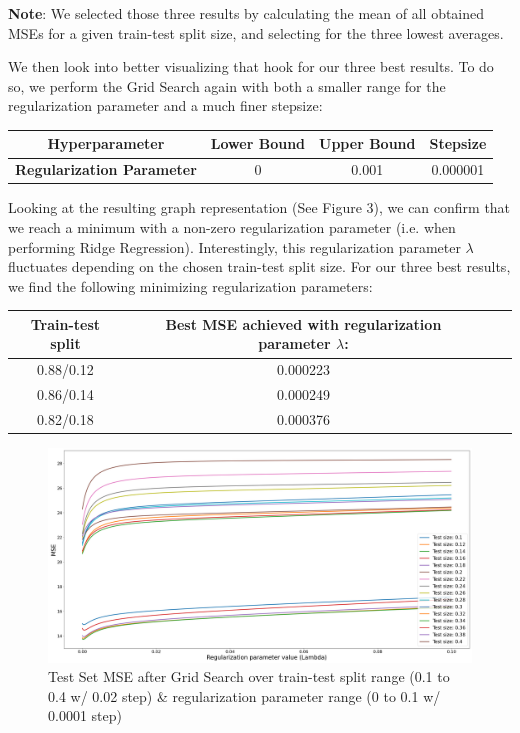 \documentclass{homework}
\begin{document}
\textbf{Note}: We selected those three results by calculating the mean of all obtained MSEs for a given train-test 
split size, and selecting for the three lowest averages.

We then look into better visualizing that hook for our three best results. To do so, we perform the Grid Search
again with both a smaller range for the regularization parameter and a much finer stepsize:

\begin{center}
\begin{tabular}{ | c | c | c | c | } 
\hline
\textbf{Hyperparameter} & \textbf{Lower Bound} & \textbf{Upper Bound} & \textbf{Stepsize} \\
\hline
\textbf{Regularization Parameter} & 0 & 0.001 & 0.000001 \\
\hline
\end{tabular}
\end{center}

Looking at the resulting graph representation (See Figure 3), we can confirm that we reach a minimum with a
non-zero regularization parameter (i.e. when performing Ridge Regression). Interestingly, this regularization 
parameter $\lambda$ fluctuates depending on the chosen train-test split size. For our three best results, we 
find the following minimizing regularization parameters:

\begin{center}
\begin{tabular}{ | c | c | c | c | } 
\hline
\textbf{Train-test split} & \textbf{Best MSE achieved with regularization parameter $\lambda$:} \\
\hline
0.88/0.12 & 0.000223 \\
\hline
0.86/0.14 & 0.000249 \\
\hline
0.82/0.18 & 0.000376 \\
\hline
\end{tabular}
\end{center}

\begin{figure}[H]
\begin{center}
\includegraphics[width=\textwidth]{images/grid_search_w1.png}
\end{center}
\caption{Test Set MSE after Grid Search over train-test split range (0.1 to 0.4 w/ 0.02 step) \& regularization parameter range (0 to 0.1 w/ 0.0001 step)}
\end{figure}
\end{document}

